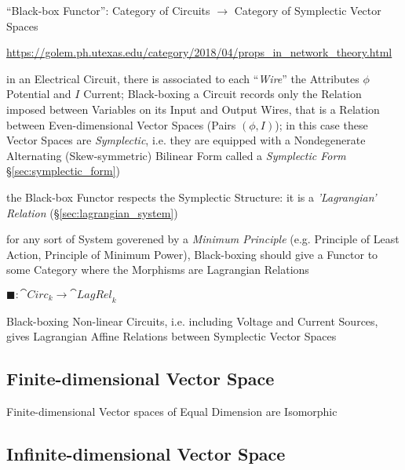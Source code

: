 ``Black-box Functor'': Category of Circuits $\rightarrow$ Category of
Symplectic Vector Spaces %

\url{https://golem.ph.utexas.edu/category/2018/04/props_in_network_theory.html}

in an Electrical Circuit, there is associated to each ``\emph{Wire}'' the
Attributes $\phi$ Potential and $I$ Current; Black-boxing a Circuit records
only the Relation imposed between Variables on its Input and Output Wires, that
is a Relation between Even-dimensional Vector Spaces (Pairs $(\phi,I)$); in
this case these Vector Spaces are \emph{Symplectic}, i.e. they are equipped
with a Nondegenerate Alternating (Skew-symmetric) Bilinear Form called a
\emph{Symplectic Form} \S\ref{sec:symplectic_form})

the Black-box Functor respects the Symplectic Structure: it is a
\emph{'Lagrangian' Relation} (\S\ref{sec:lagrangian_system})

for any sort of System goverened by a \emph{Minimum Principle} (e.g. Principle
of Least Action, Principle of Minimum Power), Black-boxing should give a
Functor to some Category where the Morphisms are Lagrangian Relations

$\blacksquare : \cat{Circ}_k \rightarrow \cat{LagRel}_k$

Black-boxing Non-linear Circuits, i.e. including Voltage and Current Sources,
gives Lagrangian Affine Relations between Symplectic Vector Spaces



\subsection{Finite-dimensional Vector Space}
\label{sec:finite_dimensional_vectorspace}

Finite-dimensional Vector spaces of Equal Dimension are Isomorphic



\subsection{Infinite-dimensional Vector Space}
\label{sec:infinite_dimensional_vectorspace}

